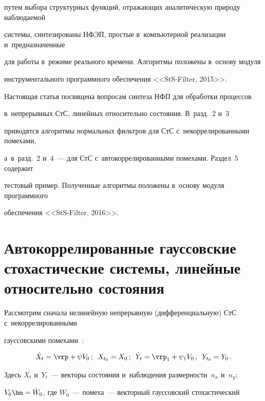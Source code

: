  путем выбора структурных функций, отражающих аналитическую природу наблюдаемой 


 системы, синтезированы НФЭП, простые в~компьютерной реализации и~предназначенные 


 для работы в~режиме реального времени. Алгоритмы положены в~основу модуля 


 инструментального программного обеспечения <<StS-Filter, 2015>>.





Настоящая статья  посвящена вопросам синтеза НФП для обработки процессов 


в~непрерывных  СтС, линейных относительно состояния. В~разд.~2 и~3 


приводятся алгоритмы нормальных фильтров для СтС  с~некоррелированными помехами, 


а~в~разд.~2 и~4~--- для СтС с~автокоррелированными помехами. Раздел~5 содержит 


тестовый пример. Полученные алгоритмы положены в~основу модуля программного 


обеспечения <<StS-Filter, 2016>>.





\section{Автокоррелированные гауссовские стохастические системы, линейные относительно состояния}





Рассмотрим сначала нелинейную непрерывную (дифференциальную) СтС с~некоррелированными 


гауссовскими помехами~\cite{2-sin}:


    \begin{equation}


    \dot X_t =\vrp  + \psi  V_0\,;\enskip 


    X_{t_0} = X_0\,;\enskip 


    \dot Y_t =\vrp_1  + \psi_1  V_0\,,\enskip 


    Y_{t_0} = Y_0\,.\label{e2.1-sin}


    \end{equation}


Здесь $X_t$ и~$Y_t$~--- векторы состояния и~наблюдения размерности~$n_x$ и~$n_y$; 


$V_0\hm= \dot W_0$, где $W_0$~--- помеха~--- векторный гауссовский стохастический 


